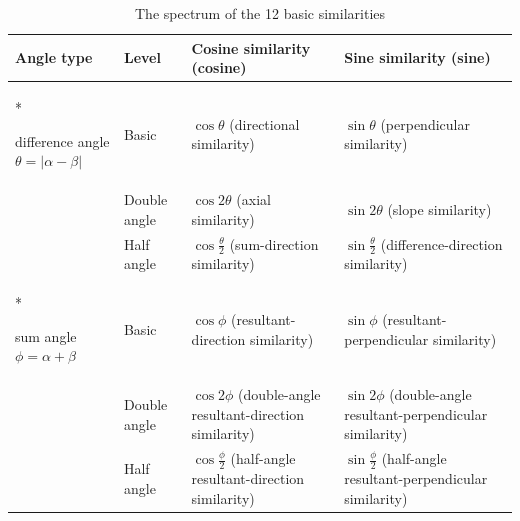 \begin{table}[htbp]
    \centering
    \caption{The spectrum of the 12 basic similarities}
    \label{tab:similarity_spectrum}
    \begin{tabular}{>{\centering\arraybackslash}p{2.2cm}>{\centering\arraybackslash}p{2cm}>{\centering\arraybackslash}p{3.5cm}>{\centering\arraybackslash}p{3.5cm}}
        \toprule
        Angle type & Level & Cosine similarity (cosine) & Sine similarity (sine) \\
        \midrule
        \multirow{3}*{\parbox{2.0cm}{\centering difference angle $\theta=\lvert\alpha-\beta\rvert$}}
        & Basic & $\cos\theta$ (directional similarity) & $\sin\theta$ (perpendicular similarity) \\
        & Double angle & $\cos 2\theta$ (axial similarity) & $\sin 2\theta$ (slope similarity) \\
        & Half angle & $\cos\frac{\theta}{2}$ (sum-direction similarity) & $\sin\frac{\theta}{2}$ (difference-direction similarity) \\
        \midrule
        \multirow{3}*{\parbox{2.0cm}{\centering sum angle $\phi=\alpha+\beta$}}
        & Basic & $\cos\phi$ (resultant-direction similarity) & $\sin\phi$ (resultant-perpendicular similarity) \\
        & Double angle & $\cos 2\phi$ (double-angle resultant-direction similarity) & $\sin 2\phi$ (double-angle resultant-perpendicular similarity) \\
        & Half angle & $\cos\frac{\phi}{2}$ (half-angle resultant-direction similarity) & $\sin\frac{\phi}{2}$ (half-angle resultant-perpendicular similarity) \\
        \bottomrule
    \end{tabular}
\end{table}

